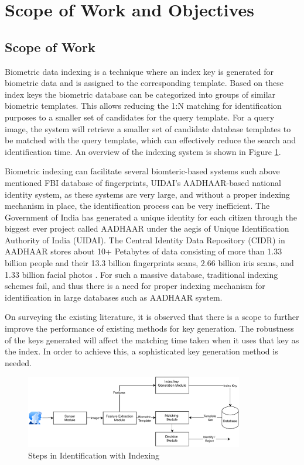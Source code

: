 
\section{Scope of Work and Objectives}
\label{scope}

\subsection{Scope of Work}
Biometric data indexing is a technique where an index key is generated for biometric
data and is assigned to the corresponding template. 
Based on these index keys the
biometric database can be categorized into groups of similar biometric templates.
This allows reducing the 1:N matching for identification purposes to a smaller set
of candidates for the query template. For a query image, the system will retrieve a
smaller set of candidate database templates to be matched with the query template,
which can effectively reduce the search and identification time. An overview of the indexing system is shown in Figure \ref{fig:steps_id}.
 
Biometric indexing can facilitate several biomteric-based systems such above mentioned FBI database of fingerprints, UIDAI's AADHAAR-based national identity system, as these systems are very large, and without a proper indexing mechanism in place, the identification process can be very inefficient. The Government of India has generated a
unique identity for each citizen through the biggest ever project called AADHAAR
under the aegis of Unique Identification Authority of India (UIDAI). The Central
Identity Data Repository (CIDR) in AADHAAR stores about 10+ Petabytes of data
 consisting of more than 1.33 billion people and their 13.3 billion fingerprints scans,
 2.66 billion iris scans, and 1.33 billion facial photos \cite{uidai}. For such a massive database, traditional indexing schemes fail, and thus there is a need for proper indexing mechanism for identification in large databases such as AADHAAR system.

 On surveying the existing literature, it is observed that there is a scope to further improve the performance of existing methods for key generation. 
 The robustness of the keys generated will affect the matching time taken when it uses that key as the index. 
 In order to achieve this, a sophisticated key generation method is needed.

 \begin{figure}[!ht]
    \centering
    \includegraphics[width=0.85\textwidth]{images/steps_in_identification_with_indexing.drawio.pdf}
    \caption{Steps in Identification with Indexing}
    \label{fig:steps_id}
\end{figure}

